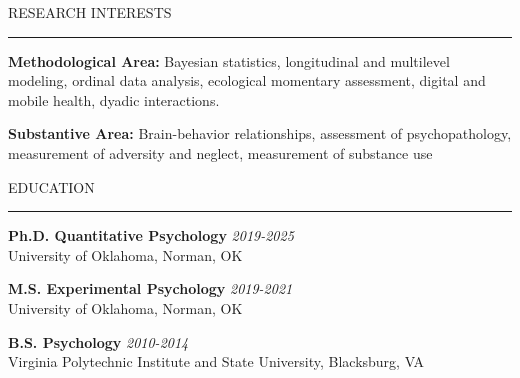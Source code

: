 \documentclass{resume} %
\renewenvironment{rSection}[1]{
	\sectionskip
	\textcolor{CarnegieMellonRed}{\MakeUppercase{#1}}
	\sectionlineskip
	\hrule
	\begin{list}{}{
			\setlength{\leftmargin}{1.5em}
		}
		\item[]
	}{
	\end{list}
}
\begin{document}
	\begin{rSection}{Research Interests}
		\textbf{Methodological Area:} Bayesian statistics, longitudinal and multilevel modeling, ordinal data analysis, ecological
		momentary assessment, digital and mobile health, dyadic interactions.
		
		\textbf{Substantive Area:} Brain-behavior relationships, assessment of psychopathology, measurement of adversity and neglect, measurement of substance use
	\end{rSection}
	
	
	\begin{rSection}{Education}
		{\bf Ph.D. Quantitative Psychology} \hfill {\em 2019-2025} 
		\\ University of Oklahoma, Norman, OK \hfill 
		
		{\bf M.S. Experimental Psychology} \hfill {\em 2019-2021} 
		\\ University of Oklahoma, Norman, OK \hfill
		
		{\bf B.S. Psychology} \hfill {\em 2010-2014}
		\\ Virginia Polytechnic Institute and State University, Blacksburg, VA
		
	\end{rSection}
	
	
	
\end{document}
